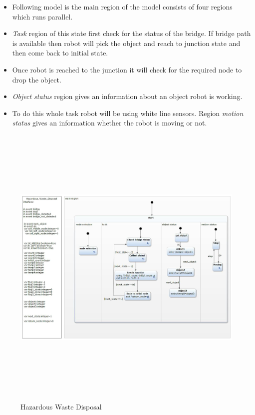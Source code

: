 \documentclass[a4paper,12pt,oneside]{article}
\begin{document}
\begin{itemize}
\item Following model is the main region of the model consists of four regions which runs parallel.
\item \emph{Task} region of this state first check for the status of the bridge. If bridge path is available then robot will pick the object and reach to junction state and then come back to initial state.\\
\item Once robot is reached to the junction it will check for the required node to drop the object.\\
\item \emph{Object status} region gives an information about an object robot is working. \\
\item To do this whole task robot will be using white line sensors. Region \emph{motion status} gives an information whether the robot is moving or not.\\
\end{itemize}
\newpage
\begin{figure}[H]
\centering
\includegraphics[width=18cm,height=14cm]{51.jpg}
\caption{Hazardous Waste Disposal}
\end{figure}
\end{document}
